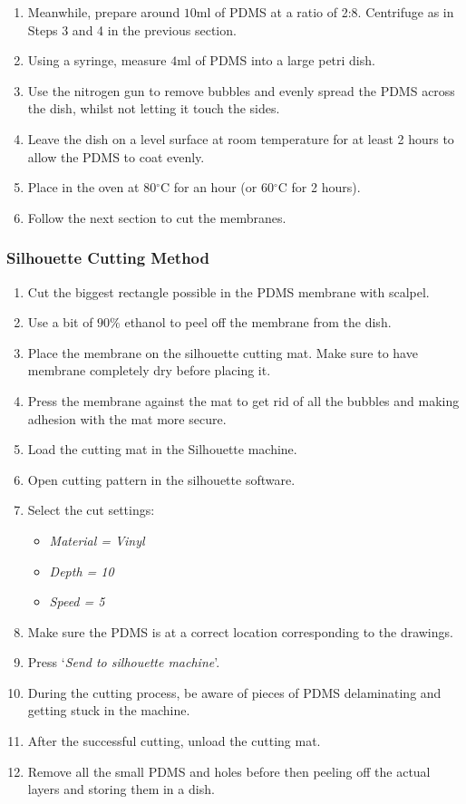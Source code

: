 \begin{enumerate}
	 \setlength\itemsep{-0.1em}
	\item Meanwhile, prepare around $10  \text{ml}$ of PDMS at a ratio of 2:8. Centrifuge as in Steps 3 and 4 in the previous section.
	\item Using a syringe, measure $4  \text{ml}$ of PDMS into a large petri dish.
	\item Use the nitrogen gun to remove bubbles and evenly spread the PDMS across the dish, whilst not letting it touch the sides.
	\item Leave the dish on a level surface at room temperature for at least 2 hours to allow the PDMS to coat evenly.
	\item Place in the oven at 80$^{\circ}$C for an hour (or 60$^{\circ}$C for 2 hours).
	\item Follow the next section to cut the membranes.
\end{enumerate}

\subsubsection*{Silhouette Cutting Method}

\begin{enumerate}
		 \setlength\itemsep{-0.1em}
	\setcounter{enumi}{6}
	\item Cut the biggest rectangle possible in the PDMS membrane with scalpel.
	\item Use a bit of $90\%$ ethanol to peel off the membrane from the dish.
	\item Place the membrane on the silhouette cutting mat. Make sure to have membrane completely dry before placing it.
	\item Press the membrane against the mat to get rid of all the bubbles and making adhesion with the mat more secure.
	\item Load the cutting mat in the Silhouette machine.
	\item Open cutting pattern in the silhouette software.
	\item Select the cut settings:
	\begin{itemize}
			 \setlength\itemsep{-0.1em}
		\item \textit{Material = Vinyl}
		\item \textit{Depth = 10}
		\item \textit{Speed = 5}
	\end{itemize}
	\item Make sure the PDMS is at a correct location corresponding to the drawings.
	\item Press `\textit{Send to silhouette machine}'.
	\item During the cutting process, be aware of pieces of PDMS delaminating and getting stuck in the machine.
	\item After the successful cutting, unload the cutting mat.
	\item Remove all the small PDMS and holes before then peeling off the actual layers and storing them in a dish.
\end{enumerate}


